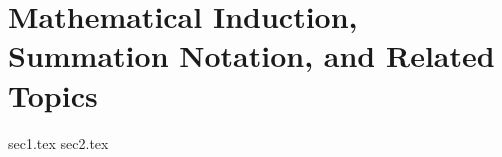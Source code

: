 \chapter{Mathematical Induction, Summation Notation, and Related Topics}\label{ch:1.4}

{sec1.tex}
{sec2.tex}
